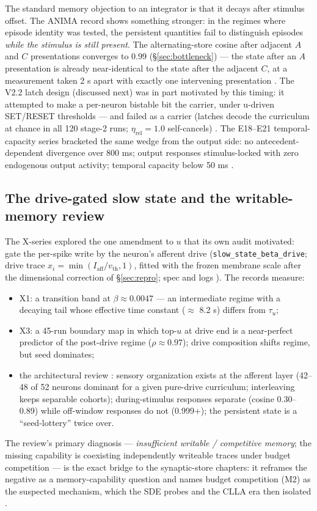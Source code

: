 The standard memory objection to an integrator is that it decays after
stimulus offset. The ANIMA record shows something stronger: in the
regimes where episode identity was tested, the persistent quantities
fail to distinguish episodes \emph{while the stimulus is still
present}. The alternating-store cosine after adjacent \(A\) and \(C\)
presentations converges to 0.99 (\S\ref{sec:bottleneck}) --- the state
after an \(A\) presentation is already near-identical to the state after
the adjacent \(C\), at a measurement taken 2 s apart with exactly one
intervening presentation \cite{synmem}. The V2.2 latch design
(discussed next) was in part motivated by this timing: it attempted to
make a per-neuron bistable bit the carrier, under u-driven SET/RESET
thresholds --- and failed as a carrier (latches decode the curriculum at
chance in all 120 stage-2 runs; \(\eta_{\mathrm{rel}}=1.0\)
self-cancels) \cite{overview}. The E18--E21 temporal-capacity series
bracketed the same wedge from the output side: no antecedent-dependent
divergence over 800 ms; output responses stimulus-locked with zero
endogenous output activity; temporal capacity below 50 ms
\cite{overview}.

\subsection{The drive-gated slow state and the writable-memory review}

The X-series explored the one amendment to \(u\) that its own audit
motivated: gate the per-spike write by the neuron's afferent drive
(\texttt{slow\_state\_beta\_drive}; drive trace
\(x_i = \min(I_{\mathrm{aff}}/v_{\mathrm{th}}, 1)\), fitted with
the frozen membrane scale after the dimensional correction of
\S\ref{sec:repro}; spec and logs
\cite{xspecdrive,xplorlog}). The records measure:
\begin{itemize}
\item X1: a transition band at \(\beta \approx 0.0047\) --- an
intermediate regime with a decaying tail whose effective time constant
(\(\approx\) 8.2 s) differs from \(\tau_u\);
\item X3: a 45-run boundary map in which top-\(u\) at drive end is a
near-perfect predictor of the post-drive regime (\(\rho \approx
0.97\)); drive composition shifts regime, but seed dominates;
\item the architectural review \cite{xplor2}: sensory organization
exists at the afferent layer (42--48 of 52 neurons dominant for a given
pure-drive curriculum; interleaving keeps separable cohorts);
during-stimulus responses separate (cosine 0.30--0.89) while
off-window responses do not (0.999+); the persistent state is a
``seed-lottery'' twice over.
\end{itemize}
The review's primary diagnosis --- \emph{insufficient writable /
competitive memory}; the missing capability is coexisting
independently writeable traces under budget competition --- is the
exact bridge to the synaptic-store chapters: it reframes the negative
as a memory-capability question and names budget competition (M2) as
the suspected mechanism, which the SDE probes and the CLLA era then
isolated \cite{xplor2,overview}.

